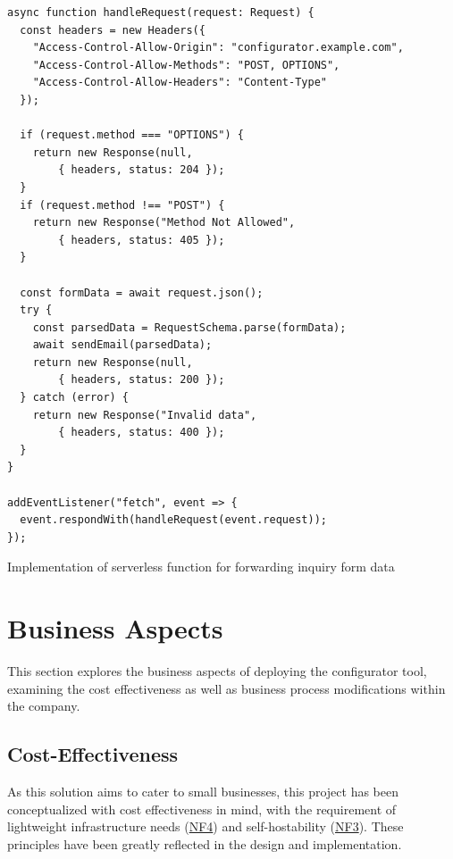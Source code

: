 \begin{listing}[h!]
\begin{verbatim}
async function handleRequest(request: Request) {
  const headers = new Headers({
    "Access-Control-Allow-Origin": "configurator.example.com",
    "Access-Control-Allow-Methods": "POST, OPTIONS",
    "Access-Control-Allow-Headers": "Content-Type"
  });

  if (request.method === "OPTIONS") {
    return new Response(null,
        { headers, status: 204 });
  }
  if (request.method !== "POST") {
    return new Response("Method Not Allowed",
        { headers, status: 405 });
  }

  const formData = await request.json();
  try {
    const parsedData = RequestSchema.parse(formData);
    await sendEmail(parsedData);
    return new Response(null, 
        { headers, status: 200 });
  } catch (error) {
    return new Response("Invalid data",
        { headers, status: 400 });
  }
}

addEventListener("fetch", event => {
  event.respondWith(handleRequest(event.request));
});
\end{verbatim}
\caption{Implementation of serverless function for forwarding inquiry form data}
\label{listing:serverless}
\end{listing}


\section{Business Aspects}

This section explores the business aspects of deploying the configurator tool, examining the cost effectiveness as well as business process modifications within the company.


\subsection{Cost-Effectiveness}

As this solution aims to cater to small businesses, this project has been conceptualized with cost effectiveness in mind, with the requirement of lightweight infrastructure needs (\hyperref[itm:NF4]{NF4}) and self-hostability (\hyperref[itm:NF3]{NF3}). These principles have been greatly reflected in the design and implementation.

